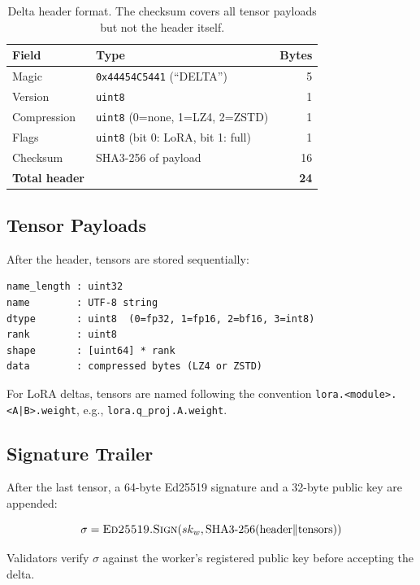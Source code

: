 \documentclass[11pt,letterpaper]{article}
\begin{document}
\begin{table}[t]
\centering
\begin{tabular}{llr}
\toprule
\textbf{Field} & \textbf{Type} & \textbf{Bytes} \\
\midrule
Magic & \texttt{0x44454C5441} (``DELTA'') & 5 \\
Version & \texttt{uint8} & 1 \\
Compression & \texttt{uint8} (0=none, 1=LZ4, 2=ZSTD) & 1 \\
Flags & \texttt{uint8} (bit 0: LoRA, bit 1: full) & 1 \\
Checksum & SHA3-256 of payload & 16 \\
\midrule
\textbf{Total header} & & \textbf{24} \\
\bottomrule
\end{tabular}
\caption{Delta header format. The checksum covers all tensor payloads but not the header itself.}
\label{tab:delta-header}
\end{table}

\subsection{Tensor Payloads}

After the header, tensors are stored sequentially:

\begin{lstlisting}[language={},caption=Tensor entry layout]
name_length : uint32
name        : UTF-8 string
dtype       : uint8  (0=fp32, 1=fp16, 2=bf16, 3=int8)
rank        : uint8
shape       : [uint64] * rank
data        : compressed bytes (LZ4 or ZSTD)
\end{lstlisting}

For LoRA deltas, tensors are named following the convention \texttt{lora.<module>.<A|B>.weight}, e.g., \texttt{lora.q\_proj.A.weight}.

\subsection{Signature Trailer}

After the last tensor, a 64-byte Ed25519 signature and a 32-byte public key are appended:

\begin{equation}
    \sigma = \textsc{Ed25519.Sign}(sk_w, \text{SHA3-256}(\text{header} \| \text{tensors}))
\end{equation}

Validators verify $\sigma$ against the worker's registered public key before accepting the delta.
\end{document}
